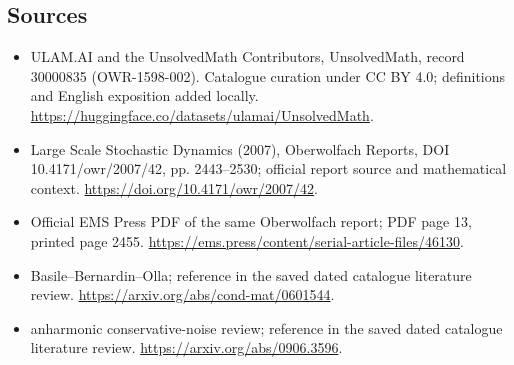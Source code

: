 \documentclass[11pt]{article}
\begin{document}
\subsection{Sources}
\begin{itemize}
\item[\hypertarget{source:30000835:1}{S1}] ULAM.AI and the UnsolvedMath Contributors, UnsolvedMath, record 30000835 (OWR-1598-002). Catalogue curation under CC BY 4.0; definitions and English exposition added locally.
\url{https://huggingface.co/datasets/ulamai/UnsolvedMath}.
\item[\hypertarget{source:30000835:2}{S2}] Large Scale Stochastic Dynamics (2007), Oberwolfach Reports, DOI 10.4171/owr/2007/42, pp. 2443--2530; official report source and mathematical context.
\url{https://doi.org/10.4171/owr/2007/42}.
\item[\hypertarget{source:30000835:3}{S3}] Official EMS Press PDF of the same Oberwolfach report; PDF page 13, printed page 2455.
\url{https://ems.press/content/serial-article-files/46130}.
\item[\hypertarget{source:30000835:4}{S4}] Basile--Bernardin--Olla; reference in the saved dated catalogue literature review.
\url{https://arxiv.org/abs/cond-mat/0601544}.
\item[\hypertarget{source:30000835:5}{S5}] anharmonic conservative-noise review; reference in the saved dated catalogue literature review.
\url{https://arxiv.org/abs/0906.3596}.
\end{itemize}
\label{end:30000835}
\end{document}
